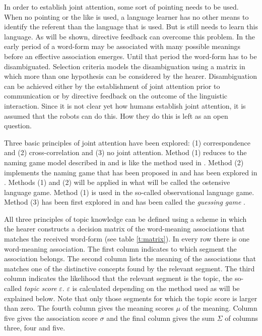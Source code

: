 In order to establish joint attention, some sort of pointing needs to be used. When no pointing or the like is used, a language learner has no other means to identify the referent than the language that is used. But is still needs to learn this language. As will be shown, directive feedback can overcome this problem. In the early period of a word-form may be associated with  many possible meanings before an effective association emerges. Until that period the word-form has to be disambiguated. Selection criteria models the disambiguation using a matrix in which more than one hypothesis can be considered by the hearer. Disambiguation can be achieved either by the establishment of joint attention prior to communication or by directive feedback on the outcome of the linguistic interaction. Since it is not clear yet how humans establish joint attention, it is assumed that the robots can do this. How they do this is left as an open question.

Three basic principles of joint attention have been explored: (1) correspondence and (2) cross-correlation and (3) no joint attention. Method (1) reduces to the naming game model described in \cite{steels:1996a} and is like the method used in \cite{steelsvogt:1997}. Method (2) implements the naming game that has been proposed in \cite{steelskaplan:1998} and has been explored in \cite{vogt:1998b,vogt:1998c}. Methods (1) and (2) will be applied in what will be called the ostensive language game. Method (1) is used in the so-called observational language game. Method (3) has been first explored in \cite{vogt:1998c} and has been called the {\em guessing game} \cite{steelskaplan:1999}.

All three principles of topic knowledge can be defined using a scheme in which the hearer constructs a decision matrix of the word-meaning associations that matches the received word-form (see table \ref{t:matrix}). In every row there is one word-meaning association. The first column indicates to which segment the association belongs. The second column lists the meaning of the associations that matches one of the distinctive concepts found by the relevant segment. The third column indicates the likelihood that the relevant segment is the topic, the so-called {\em topic score} $\varepsilon$. $\varepsilon$ is calculated depending on the method used as will be explained below. Note that only those segments for which the topic score is larger than zero. The fourth column gives the meaning scores $\mu$ of the meaning. Column five gives the association score $\sigma$ and the final column gives the sum $\Sigma$ of columns three, four and five.

